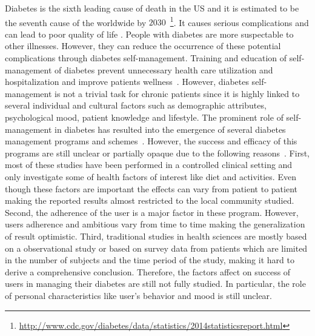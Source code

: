 \documentclass{acm_proc_article-sp}
\begin{document}
Diabetes is the sixth leading cause of death in the US and it is estimated to be the seventh cause of the worldwide by $2030$~\footnote{\url{http://www.cdc.gov/diabetes/data/statistics/2014statisticsreport.html}}. It causes serious complications and can lead to poor quality of life \cite{american2012standards}. People with diabetes are more suspectable to other illnesses. However, they can reduce the occurrence of these potential complications through diabetes self-management. Training and education of self-management of diabetes prevent unnecessary health care utilization and hospitalization and improve patients wellness~\cite{haas2013national}. However, diabetes self-management is not a trivial task for chronic patients since it is highly linked to several individual and cultural factors such as demographic attributes, psychological mood, patient knowledge and lifestyle. The prominent role of self-management in diabetes has resulted into the emergence of several diabetes management programs and schemes~\cite{haas2013national}. However, the success and efficacy of this programs are still unclear or partially opaque due to the following reasons~\cite{garrett2005patient,lorig2010online}. First, most of these studies have been performed in a controlled clinical setting and only investigate some of health factors of interest like diet and activities. Even though these factors are important the effects can vary from patient to patient making the reported results almost restricted to the local community studied. Second, the adherence of the user is a major factor in these program. However, users adherence and ambitious vary from time to time making the generalization of result optimistic.
Third, traditional studies in health sciences are mostly based on a observational study or based on survey data from patients which are limited in the number of subjects and the time period of the study, making it hard to derive a comprehensive conclusion. Therefore, the factors affect on success of users in managing their diabetes are still not fully studied. In particular, the role of personal characteristics like user's behavior and mood is still unclear.
\end{document}
